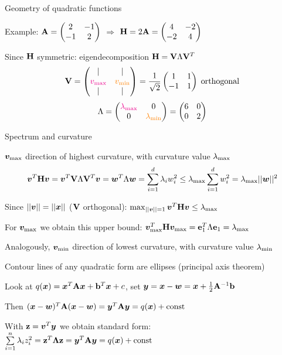\documentclass[11pt,compress,t,notes=noshow, xcolor=table]{beamer}
\begin{document}
\begin{framei}{Geometry of quadratic functions}
\item Example: $\mathbf{A} = \begin{pmatrix} 2 & -1 \\ -1 & 2\end{pmatrix}$ $\Rightarrow$ $\mathbf{H} = 2\mathbf{A} = \begin{pmatrix} 4 & -2 \\ -2 & 4\end{pmatrix}$
\item Since $\mathbf{H}$ symmetric: eigendecomposition $\mathbf{H} = \mathbf{V}\Lambda\mathbf{V}^T$
\begin{equation*}
\mathbf{V} = \begin{pmatrix}
| & | \\
\textcolor{magenta}{v_\text{max}} & \textcolor{orange}{v_\text{min}} \\
| & |
\end{pmatrix}
= \frac{1}{\sqrt{2}} \begin{pmatrix}
1 & 1 \\
-1 & 1
\end{pmatrix}\;\text{orthogonal}
\end{equation*}
\begin{equation*}
\Lambda = \begin{pmatrix}
\textcolor{magenta}{\lambda_\text{max}} & 0 \\
0 & \textcolor{orange}{\lambda_\text{min}}
\end{pmatrix}
= \begin{pmatrix}6 & 0 \\ 0 & 2\end{pmatrix}
\end{equation*}
\end{framei}

\begin{framei}[fs=footnotesize]{Spectrum and curvature}
\item $\bm{v}_\text{max}$ direction of highest curvature, with curvature value $\lambda_\text{max}$
$$
\bm{v}^T \mathbf{H} \bm{v} = \bm{v}^T \mathbf{V} \Lambda \mathbf{V}^T \bm{v} = \bm{w}^T \Lambda \bm{w} = 
\sum\limits_{i=1}^d \lambda_i w_i^2 \le \lambda_\text{max} \sum\limits_{i=1}^d w_i^2 = \lambda_\text{max} || \bm{w} ||^2
$$
\item Since $|| \bm{v} || = || \bm{x} ||$ ($\mathbf{V}$ orthogonal): 
$\max_{|| \bm{v} || = 1} \bm{v}^T \mathbf{H} \bm{v} \le \lambda_\text{max}$
\item For $\bm{v}_\text{max}$ we obtain this upper bound:
$\bm{v}_\text{max}^T \mathbf{H} \bm{v}_\text{max} = \mathbf{e}_1^T \Lambda \mathbf{e}_1 = \lambda_\text{max}$ 
\item Analogously, $\bm{v}_\text{min}$ direction of lowest curvature, with curvature value $\lambda_\text{min}$
\item Contour lines of any quadratic form are ellipses (principal axis theorem)
\item[] Look at $q(\bm{x}) = \bm{x}^T \mathbf{A} \bm{x} + \mathbf{b}^T \bm{x} + c$, set $\bm{y} = \bm{x} - \bm{w} = \bm{x} + \tfrac{1}{2} \mathbf{A}^{-1} \mathbf{b}$
\item[] Then $(\bm{x}-\bm{w})^T \mathbf{A} (\bm{x}-\bm{w}) = \bm{y}^T \mathbf{A} \bm{y} = q(\bm{x}) + \text{const}$
\item[] With $\mathbf{z} = \bm{v}^T \bm{y}$ we obtain standard form: $\sum\limits_{i=1}^n \lambda_i z_i^2 = \mathbf{z}^T \bm{\Lambda} \mathbf{z} = \bm{y}^T \mathbf{A} \bm{y} = q(\bm{x}) + \text{const}$
\end{framei}
\end{document}
